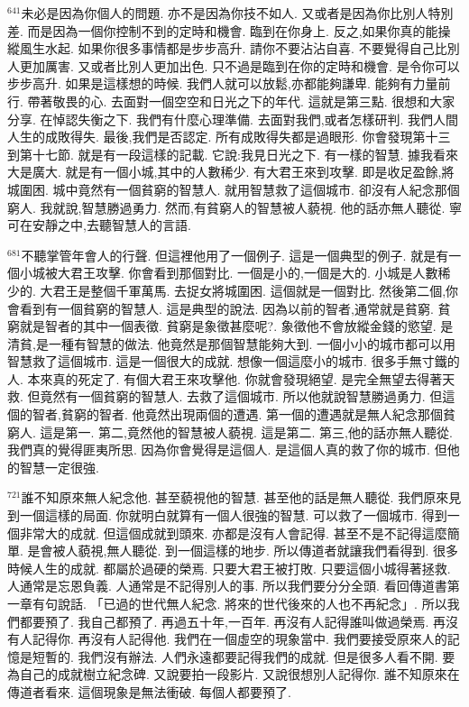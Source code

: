 \documentclass{book}
\begin{document}
$^{641}$未必是因為你個人的問題.
亦不是因為你技不如人.
又或者是因為你比別人特別差.
而是因為一個你控制不到的定時和機會.
臨到在你身上.
反之,如果你真的能操縱風生水起.
如果你很多事情都是步步高升.
請你不要沾沾自喜.
不要覺得自己比別人更加厲害.
又或者比別人更加出色.
只不過是臨到在你的定時和機會.
是令你可以步步高升.
如果是這樣想的時候.
我們人就可以放鬆,亦都能夠謙卑.
能夠有力量前行.
帶著敬畏的心.
去面對一個空空和日光之下的年代.
這就是第三點.
很想和大家分享.
在悼認失衡之下.
我們有什麼心理準備.
去面對我們,或者怎樣研判.
我們人間人生的成敗得失.
最後,我們是否認定.
所有成敗得失都是過眼形.
你會發現第十三到第十七節.
就是有一段這樣的記載.
它說:我見日光之下.
有一樣的智慧.
據我看來大是廣大.
就是有一個小城,其中的人數稀少.
有大君王來到攻擊.
即是收足盈餘,將城圍困.
城中竟然有一個貧窮的智慧人.
就用智慧救了這個城市.
卻沒有人紀念那個窮人.
我就說,智慧勝過勇力.
然而,有貧窮人的智慧被人藐視.
他的話亦無人聽從.
寧可在安靜之中,去聽智慧人的言語.

$^{681}$不聽掌管年會人的行聲.
但這裡他用了一個例子.
這是一個典型的例子.
就是有一個小城被大君王攻擊.
你會看到那個對比.
一個是小的,一個是大的.
小城是人數稀少的.
大君王是整個千軍萬馬.
去捉女將城圍困.
這個就是一個對比.
然後第二個,你會看到有一個貧窮的智慧人.
這是典型的說法.
因為以前的智者,通常就是貧窮.
貧窮就是智者的其中一個表徵.
貧窮是象徵甚麼呢?.
象徵他不會放縱金錢的慾望.
是清貧,是一種有智慧的做法.
他竟然是那個智慧能夠大到.
一個小小的城市都可以用智慧救了這個城市.
這是一個很大的成就.
想像一個這麼小的城市.
很多手無寸鐵的人.
本來真的死定了.
有個大君王來攻擊他.
你就會發現絕望.
是完全無望去得著天救.
但竟然有一個貧窮的智慧人.
去救了這個城市.
所以他就說智慧勝過勇力.
但這個的智者,貧窮的智者.
他竟然出現兩個的遭遇.
第一個的遭遇就是無人紀念那個貧窮人.
這是第一.
第二,竟然他的智慧被人藐視.
這是第二.
第三,他的話亦無人聽從.
我們真的覺得匪夷所思.
因為你會覺得是這個人.
是這個人真的救了你的城市.
但他的智慧一定很強.

$^{721}$誰不知原來無人紀念他.
甚至藐視他的智慧.
甚至他的話是無人聽從.
我們原來見到一個這樣的局面.
你就明白就算有一個人很強的智慧.
可以救了一個城市.
得到一個非常大的成就.
但這個成就到頭來.
亦都是沒有人會記得.
甚至不是不記得這麼簡單.
是會被人藐視,無人聽從.
到一個這樣的地步.
所以傳道者就讓我們看得到.
很多時候人生的成就.
都屬於過硬的榮焉.
只要大君王被打敗.
只要這個小城得著拯救.
人通常是忘恩負義.
人通常是不記得別人的事.
所以我們要分分全頭.
看回傳道書第一章有句說話.
「已過的世代無人紀念.
將來的世代後來的人也不再紀念」.
所以我們都要預了.
我自己都預了.
再過五十年,一百年.
再沒有人記得誰叫做過榮焉.
再沒有人記得你.
再沒有人記得他.
我們在一個虛空的現象當中.
我們要接受原來人的記憶是短暫的.
我們沒有辦法.
人們永遠都要記得我們的成就.
但是很多人看不開.
要為自己的成就樹立紀念碑.
又說要拍一段影片.
又說很想別人記得你.
誰不知原來在傳道者看來.
這個現象是無法衝破.
每個人都要預了.
\end{document}
